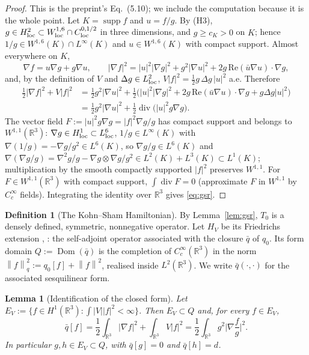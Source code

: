 \documentclass[11pt,a4paper]{article}
\theoremstyle{plain}
\newtheorem{lemma}[theorem]{Lemma}
\theoremstyle{definition}
\newtheorem{definition}[theorem]{Definition}
\theoremstyle{remark}
\newcommand{\R}{\mathbb{R}}
\newcommand{\norm}[1]{\left\|#1\right\|}
\DeclareMathOperator{\supp}{supp}
\DeclareMathOperator{\Dom}{Dom}
\DeclareMathOperator{\divg}{div}
\begin{document}
\begin{proof}
This is the preprint's Eq.~(5.10); we include the computation because it is the whole point. Let $K=\supp f$ and $u=f/g$. By (H3), $g\in H^2_{\rm loc}\subset W^{1,6}_{\rm loc}\cap C^{0,1/2}_{\rm loc}$ in three dimensions, and $g\ge c_K>0$ on $K$; hence $1/g\in W^{1,6}(K)\cap L^\infty(K)$ and $u\in W^{1,6}(K)$ with compact support. Almost everywhere on $K$,
\[
\nabla f=u\nabla g+g\nabla u,\qquad |\nabla f|^2=|u|^2|\nabla g|^2+g^2|\nabla u|^2+2g\,\mathrm{Re}(\bar u\nabla u)\cdot\nabla g,
\]
and, by the definition of $V$ and $\Delta g\in L^2_{\rm loc}$, $V|f|^2=\tfrac12 g\,\Delta g\,|u|^2$ a.e. Therefore
\[
\begin{aligned}
\tfrac12|\nabla f|^2+V|f|^2&=\tfrac12 g^2|\nabla u|^2+\tfrac12\Big(|u|^2|\nabla g|^2+2g\,\mathrm{Re}(\bar u\nabla u)\cdot\nabla g+g\Delta g|u|^2\Big)\\
&=\tfrac12 g^2|\nabla u|^2+\tfrac12\divg\!\big(|u|^2g\nabla g\big).
\end{aligned}
\]
The vector field $F:=|u|^2 g\nabla g=|f|^2\nabla g/g$ has compact support and belongs to $W^{1,1}(\R^3)$: $\nabla g\in H^1_{\rm loc}\subset L^6_{\rm loc}$, $1/g\in L^\infty(K)$ with $\nabla(1/g)=-\nabla g/g^2\in L^6(K)$, so $\nabla g/g\in L^6(K)$ and $\nabla(\nabla g/g)=\nabla^2g/g-\nabla g\otimes\nabla g/g^2\in L^2(K)+L^3(K)\subset L^1(K)$; multiplication by the smooth compactly supported $|f|^2$ preserves $W^{1,1}$. For $F\in W^{1,1}(\R^3)$ with compact support, $\int\divg F=0$ (approximate $F$ in $W^{1,1}$ by $C_c^\infty$ fields). Integrating the identity over $\R^3$ gives \eqref{eq:gsr}.
\end{proof}

\begin{definition}[The Kohn--Sham Hamiltonian]\label{def:HV}
By Lemma~\ref{lem:gsr}, $T_0$ is a densely defined, symmetric, nonnegative operator. Let $H_V$ be its Friedrichs extension \cite[Thm.~X.23]{RS2}, \cite[VI.\S2.3]{Kato}: the self-adjoint operator associated with the closure $\bar q$ of $q_0$. Its form domain $Q:=\Dom(\bar q)$ is the completion of $C_c^\infty(\R^3)$ in the norm $\norm f_q^2:=q_0[f]+\norm f^2$, realised inside $L^2(\R^3)$. We write $\bar q(\cdot,\cdot)$ for the associated sesquilinear form.
\end{definition}

\begin{lemma}[Identification of the closed form]\label{lem:EV}
Let $E_V:=\{f\in H^1(\R^3):\int|V||f|^2<\infty\}$. Then $E_V\subset Q$ and, for every $f\in E_V$,
\begin{equation}\label{eq:EVform}
\bar q[f]=\frac12\int_{\R^3}|\nabla f|^2+\int_{\R^3}V|f|^2=\frac12\int_{\R^3}g^2\Big|\nabla\frac fg\Big|^2 .
\end{equation}
In particular $g,h\in E_V\subset Q$, with $\bar q[g]=0$ and $\bar q[h]=d$.
\end{lemma}
\end{document}
